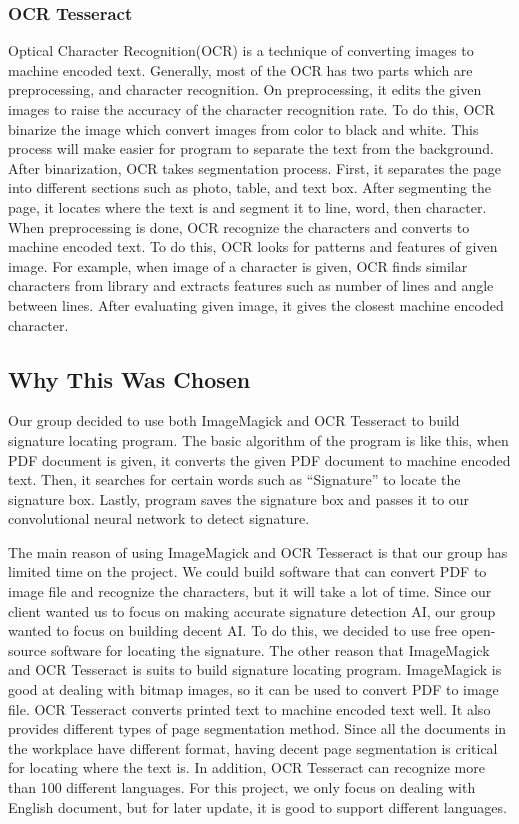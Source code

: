 \documentclass[onecolumn, draftclsnofoot,10pt, compsoc]{IEEEtran}
\begin{document}
\subsubsection{OCR Tesseract}
Optical Character Recognition(OCR) is a technique of converting images to machine encoded text. Generally, most of the OCR has two parts which are preprocessing, and character recognition. On preprocessing, it edits the given images to raise the accuracy of the character recognition rate. To do this, OCR binarize the image which convert images from color to black and white. This process will make easier for program to separate the text from the background. After binarization, OCR takes segmentation process. First, it separates the page into different sections such as photo, table, and text box. After segmenting the page, it locates where the text is and segment it to line, word, then character. When preprocessing is done, OCR recognize the characters and converts to machine encoded text. To do this, OCR looks for patterns and features of given image. For example, when image of a character is given, OCR finds similar characters from library and extracts features such as number of lines and angle between lines. After evaluating given image, it gives the closest machine encoded character.

\subsection{Why This Was Chosen}
Our group decided to use both ImageMagick and OCR Tesseract to build signature locating program. The basic algorithm of the program is like this, when PDF document is given, it converts the given PDF document to machine encoded text. Then, it searches for certain words such as “Signature” to locate the signature box. Lastly, program saves the signature box and passes it to our convolutional neural network to detect signature. 

The main reason of using ImageMagick and OCR Tesseract is that our group has limited time on the project. We could build software that can convert PDF to image file and recognize the characters, but it will take a lot of time. Since our client wanted us to focus on making accurate signature detection AI, our group wanted to focus on building decent AI. To do this, we decided to use free open-source software for locating the signature.
The other reason that ImageMagick and OCR Tesseract is suits to build signature locating program. ImageMagick is good at dealing with bitmap images, so it can be used to convert PDF to image file. OCR Tesseract converts printed text to machine encoded text well. It also provides different types of page segmentation method. Since all the documents in the workplace have different format, having decent page segmentation is critical for locating where the text is. In addition, OCR Tesseract can recognize more than 100 different languages. For this project, we only focus on dealing with English document, but for later update, it is good to support different languages.
\end{document}
